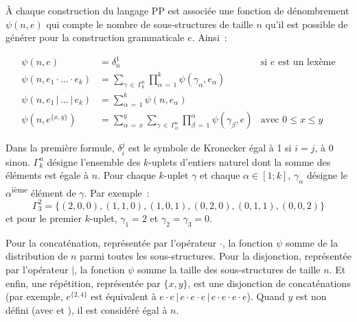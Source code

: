 À chaque construction du langage PP est associée une fonction de dénombrement
$\psi(n, e)$ qui compte le nombre de sous-structures de taille $n$ qu'il est
possible de générer pour la construction grammaticale $e$. Ainsi~:

\begin{align*}
%
\psi(n, e) & =
    \delta_n^1
    &
    \text{si $e$ est un lexème}
    \\
%
\psi(n, e_1 \cdot \dotso \cdot e_k) & =
    \sum_{\gamma \,\in\, \Gamma_k^n}
    \prod_{\alpha \,=\, 1}^k
    \psi(\gamma_\alpha, e_\alpha)
    \\
%
\psi(n, e_1 \,\vert\, \dots \,\vert\, e_k) & =
    \sum_{\alpha \,=\, 1}^k
    \psi(n, e_\alpha)
    \\
%
\psi(n, e^{\{x, y\}}) & =
    \sum_{\alpha \,=\, x}^y
    \sum_{\gamma \,\in\, \Gamma_\alpha^n}
    \prod_{\beta \,=\, 1}^\alpha
    \psi(\gamma_\beta, e)
    &
    \text{avec $0 \leq x \leq y$}
%
\end{align*}

Dans la première formule, $\delta_i^j$ est le symbole de Kronecker égal à 1 si
$i = j$, à 0 sinon. $\Gamma_k^n$ désigne l'ensemble des $k$-uplets d'entiers
naturel dont la somme des éléments est égale à $n$. Pour chaque $k$-uplet
$\gamma$ et chaque $\alpha \in [1; k]$, $\gamma_\alpha$ désigne le
$\alpha$\textsuperscript{ième} élément de $\gamma$.
%
Par exemple~:
%
$$\Gamma_3^2 = \{(2, 0, 0), (1, 1, 0), (1, 0, 1), (0, 2, 0), (0, 1, 1), (0, 0,
2)\}$$
%
et pour le premier $k$-uplet, $\gamma_1 = 2$ et $\gamma_2 = \gamma_3 = 0$.

Pour la concaténation, représentée par l'opérateur $\cdot$, la fonction $\psi$
somme de la distribution de $n$ parmi toutes les sous-structures. Pour la
disjonction, représentée par l'opérateur $\vert$, la fonction $\psi$ somme la
taille des sous-structures de taille $n$. Et enfin, une répétition, représentée
par $\{x, y\}$, est une disjonction de concaténations (par exemple,
$e^{\{2,4\}}$ est équivalent à $e \cdot e \,\vert\, e \cdot e \cdot e \,\vert\,
e \cdot e \cdot e \cdot e$). Quand $y$ est non défini (avec \code{*} et
\code{+}), il est considéré égal à $n$.


